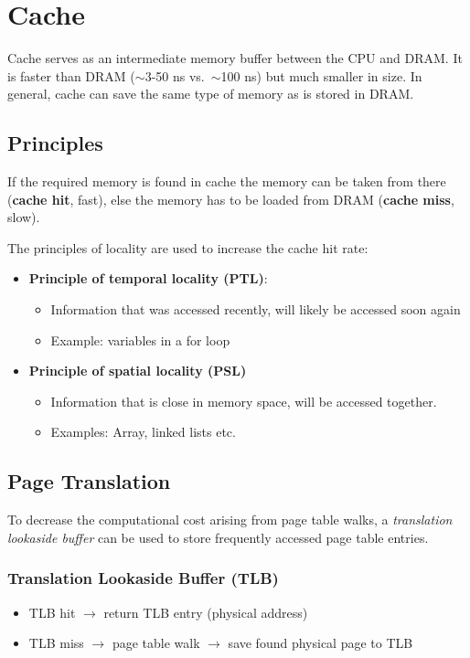 \section{Cache}
Cache serves as an intermediate memory buffer between the CPU and DRAM. It is faster than DRAM ($\sim$3-50 ns vs.\ $\sim$100 ns) but much smaller in size.
In general, cache can save the same type of memory as is stored in DRAM.
\subsection{Principles}

If the required memory is found in cache the memory can be taken from there (\textbf{cache hit}, fast), else the memory has to be loaded from DRAM (\textbf{cache miss}, slow).

\newpar{}

The principles of locality are used to increase the cache hit rate:
\begin{itemize}
    \item \textbf{Principle of temporal locality (PTL)}:
          \begin{itemize}
              \item Information that was accessed recently, will likely be accessed soon again
              \item Example: variables in a for loop
          \end{itemize}
    \item \textbf{Principle of spatial locality (PSL)}
          \begin{itemize}
              \item Information that is close in memory space, will be accessed together.
              \item Examples: Array, linked lists etc.\
          \end{itemize}
\end{itemize}

\subsection{Page Translation}
To decrease the computational cost arising from page table walks, a \textit{translation lookaside buffer} can be used to store frequently accessed page table entries.

\subsubsection{Translation Lookaside Buffer (TLB)}
\begin{itemize}
    \item TLB hit $\to$ return TLB entry (physical address)
    \item TLB miss $\to$ page table walk $\to$ save found physical page to TLB
\end{itemize}


